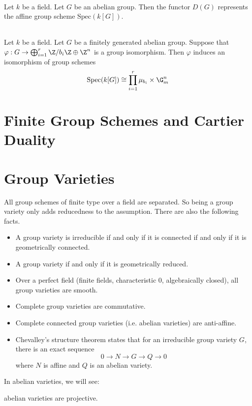 \documentclass[a4paper]{article}
\begin{document}
\begin{lmm}{}{}\\
Let $k$ be a field. Let $G$ be an abelian group. Then the functor $D(G)$ represents the affine group scheme $\text{Spec}(k[G])$. 
\end{lmm}

\begin{prp}{}{}\\
Let $k$ be a field. Let $G$ be a finitely generated abelian group. Suppose that $\varphi:G\to\bigoplus_{i=1}^r\Z/b_i\Z\oplus\Z^n$ is a group isomorphism. Then $\varphi$ induces an isomorphism of group schemes $$\text{Spec}(k[G])\cong\prod_{i=1}^r\mu_{b_i}\times\G_m^n$$
\end{prp}

\pagebreak
\section{Finite Group Schemes and Cartier Duality}

\pagebreak
\section{Group Varieties}
All group schemes of finite type over a field are separated. So being a group variety only adds reducedness to the assumption. There are also the following facts. 

\begin{itemize}
\item A group variety is irreducible if and only if it is connected if and only if it is geometrically connected. 
\item A group variety if and only if it is geometrically reduced. 
\item Over a perfect field (finite fields, characteristic $0$, algebraically closed), all group varieties are smooth. 
\item Complete group varieties are commutative. 
\item Complete connected group varieties (i.e. abelian varieties) are anti-affine. 
\item Chevalley's structure theorem states that for an irreducible group variety $G$, there is an exact sequence $$0\to N\to G\to Q\to 0$$ where $N$ is affine and $Q$ is an abelian variety. 
\end{itemize}

In abelian varieties, we will see: 

abelian varieties are projective. 
\end{document}
